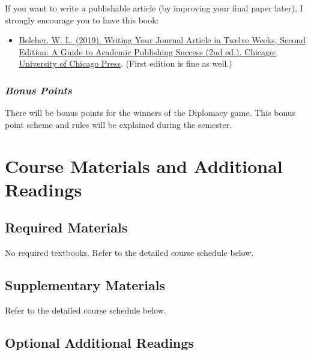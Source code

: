 \documentclass[
  letterpaper,
  DIV=11,
  numbers=noendperiod]{scrartcl}
\providecommand{\tightlist}{%
  \setlength{\itemsep}{0pt}\setlength{\parskip}{0pt}}\usepackage{longtable,booktabs,array}
\begin{document}
If you want to write a publishable article (by improving your final
paper later), I strongly encourage you to have this book:

\begin{itemize}
\tightlist
\item
  \href{https://www.amazon.com/Writing-Journal-Twelve-Weeks-Second-dp-022649991X/dp/022649991X/ref=dp_ob_title_bk}{Belcher,
  W. L. (2019). Writing Your Journal Article in Twelve Weeks, Second
  Edition: A Guide to Academic Publishing Success (2nd ed.). Chicago:
  University of Chicago Press}. (First edition is fine as well.)
\end{itemize}

\hypertarget{bonus-points}{%
\subsubsection{\texorpdfstring{\textbf{\emph{Bonus
Points}}}{Bonus Points}}\label{bonus-points}}

There will be bonus points for the winners of the Diplomacy game. This
bonus point scheme and rules will be explained during the semester.

\hypertarget{course-materials-and-additional-readings}{%
\section{\texorpdfstring{{\textbf{Course Materials and Additional
Readings}}}{Course Materials and Additional Readings}}\label{course-materials-and-additional-readings}}

\hypertarget{required-materials}{%
\subsection{Required Materials}\label{required-materials}}

No required textbooks. Refer to the detailed course schedule below.

\hypertarget{supplementary-materials}{%
\subsection{Supplementary Materials}\label{supplementary-materials}}

Refer to the detailed course schedule below.

\hypertarget{optional-additional-readings}{%
\subsection{Optional Additional
Readings}\label{optional-additional-readings}}
\end{document}
